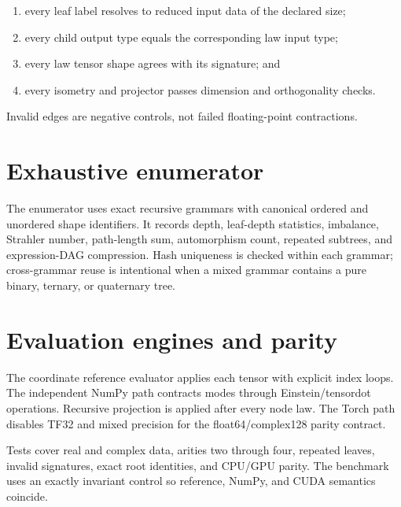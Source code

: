 \documentclass[11pt]{amsart}
\begin{document}
\begin{enumerate}[leftmargin=*]
\item every leaf label resolves to reduced input data of the declared size;
\item every child output type equals the corresponding law input type;
\item every law tensor shape agrees with its signature; and
\item every isometry and projector passes dimension and orthogonality checks.
\end{enumerate}

Invalid edges are negative controls, not failed floating-point contractions.

\section{Exhaustive enumerator}

The enumerator uses exact recursive grammars with canonical ordered and
unordered shape identifiers.  It records depth, leaf-depth statistics,
imbalance, Strahler number, path-length sum, automorphism count, repeated
subtrees, and expression-DAG compression.  Hash uniqueness is checked within
each grammar; cross-grammar reuse is intentional when a mixed grammar contains
a pure binary, ternary, or quaternary tree.

\begin{table}[t]
\centering
\caption{Generated enumeration summary.}

\end{table}

\section{Evaluation engines and parity}

The coordinate reference evaluator applies each tensor with explicit index
loops.  The independent NumPy path contracts modes through Einstein/tensordot
operations.  Recursive projection is applied after every node law.  The
Torch path disables TF32 and mixed precision for the float64/complex128 parity
contract.

Tests cover real and complex data, arities two through four, repeated leaves,
invalid signatures, exact root identities, and CPU/GPU parity.  The benchmark
uses an exactly invariant control so reference, NumPy, and CUDA semantics
coincide.

\begin{table}[t]
\centering
\caption{Generated CPU/GPU parity summary.}
\resizebox{.84\textwidth}{!}{}
\end{table}
\end{document}

